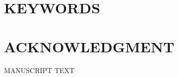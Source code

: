 \documentclass[12pt,english]{article}
\newcommand{\rrxspc}{1.5}
\begin{document}
\doublespacing
\section*{KEYWORDS}
\PAPERKEYWORDS
\clearpage 

\doublespacing
\section*{ACKNOWLEDGMENT}
\ACKNOWLEDGMENTS
\clearpage 

\setcounter{page}{1}
\renewcommand*{\thefootnote}{\arabic{footnote}}
\begingroup
  \centering
  \Large MANUSCRIPT TEXT\\[1em]
\endgroup


\pagebreak
\begingroup
{}
\setlength\bibitemsep{5.0pt}
\printbibliography[title=References for Manuscript]
\endgroup
\pagebreak



\appendix
\begin{refsection}

\setcounter{page}{1}
\end{refsection}


\end{document}
